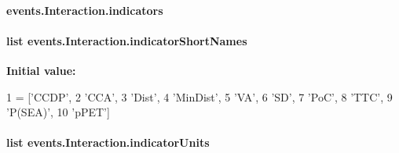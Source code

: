 \hypertarget{classevents_1_1Interaction_a63550a0bfc7e2276b72ecaaf4958ab5e}{
\paragraph[{indicators}]{\setlength{\rightskip}{0pt plus 5cm}events.\-Interaction.\-indicators}}\label{classevents_1_1Interaction_a63550a0bfc7e2276b72ecaaf4958ab5e}
\hypertarget{classevents_1_1Interaction_a85329e433b60d0b41c12c51634ff95fa}{
\paragraph[{indicator\-Short\-Names}]{\setlength{\rightskip}{0pt plus 5cm}list events.\-Interaction.\-indicator\-Short\-Names\hspace{0.3cm}{\ttfamily [static]}}}\label{classevents_1_1Interaction_a85329e433b60d0b41c12c51634ff95fa}
{\bfseries Initial value\-:}
\begin{DoxyCode}
1 = [\textcolor{stringliteral}{'CCDP'},
2                            \textcolor{stringliteral}{'CCA'},
3                            \textcolor{stringliteral}{'Dist'},
4                            \textcolor{stringliteral}{'MinDist'},
5                            \textcolor{stringliteral}{'VA'},
6                            \textcolor{stringliteral}{'SD'},
7                            \textcolor{stringliteral}{'PoC'},
8                            \textcolor{stringliteral}{'TTC'},
9                            \textcolor{stringliteral}{'P(SEA)'},
10                            \textcolor{stringliteral}{'pPET'}]
\end{DoxyCode}
\hypertarget{classevents_1_1Interaction_aab56132b6523d94fd27317ebeb1e7fd2}{
\paragraph[{indicator\-Units}]{\setlength{\rightskip}{0pt plus 5cm}list events.\-Interaction.\-indicator\-Units\hspace{0.3cm}{\ttfamily [static]}}}\label{classevents_1_1Interaction_aab56132b6523d94fd27317ebeb1e7fd2}
